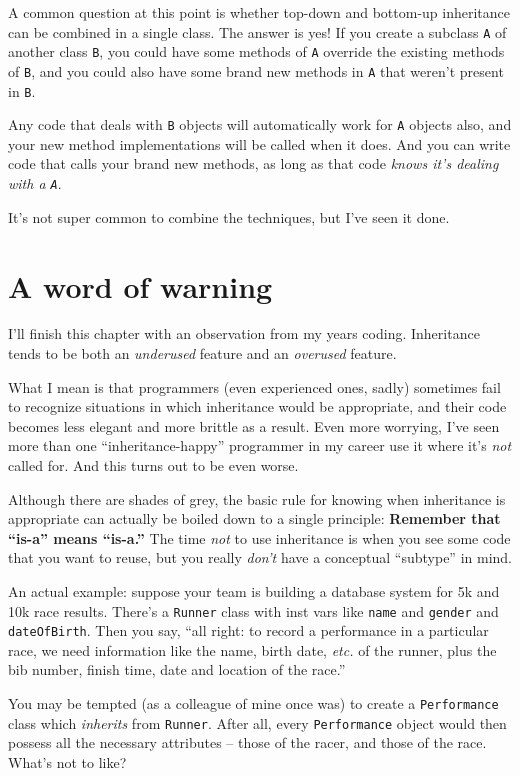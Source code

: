 A common question at this point is whether top-down and bottom-up inheritance
can be combined in a single class. The answer is yes! If you create a
subclass \texttt{A} of another class \texttt{B}, you could have some methods
of \texttt{A} override the existing methods of \texttt{B}, and you could also
have some brand new methods in \texttt{A} that weren't present in \texttt{B}.

Any code that deals with \texttt{B} objects will automatically work for
\texttt{A} objects also, and your new method implementations will be called
when it does. And you can write code that calls your brand new methods, as
long as that code \textit{knows it's dealing with a \texttt{A}}.

It's not super common to combine the techniques, but I've seen it done.

\section{A word of warning}

I'll finish this chapter with an observation from my years coding. Inheritance
tends to be both an \textit{underused} feature and an \textit{overused}
feature.

What I mean is that programmers (even experienced ones, sadly) sometimes fail
to recognize situations in which inheritance would be appropriate, and their
code becomes less elegant and more brittle as a result. Even more worrying,
I've seen more than one ``inheritance-happy'' programmer in my career use it
where it's \textit{not} called for. And this turns out to be even worse.

Although there are shades of grey, the basic rule for knowing when inheritance
is appropriate can actually be boiled down to a single principle:
\textbf{Remember that ``is-a'' means ``is-a.''} The time \textit{not} to use
inheritance is when you see some code that you want to reuse, but you really
\textit{don't} have a conceptual ``subtype'' in mind.

An actual example: suppose your team is building a database system for 5k and
10k race results. There's a \texttt{Runner} class with inst vars like
\texttt{name} and \texttt{gender} and \texttt{dateOfBirth}. Then you say,
``all right: to record a performance in a particular race, we need information
like the name, birth date, \textit{etc.} of the runner, plus the bib number,
finish time, date and location of the race.''

You may be tempted (as a colleague of mine once was) to create a
\texttt{Performance} class which \textit{inherits} from \texttt{Runner}. After
all, every \texttt{Performance} object would then possess all the necessary
attributes -- those of the racer, and those of the race. What's not to like?

